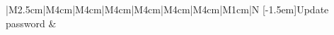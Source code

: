 \documentclass{article}
\begin{document}
\begin{table}[H]
\begin{tabular}{|M{2.5cm}|M{4cm}|M{4cm}|M{4cm}|M{4cm}|M{4cm}|M{4cm}|M{1cm}|N}
%
\hline%
[-1.5em]{\centering Update password
} &


\end{tabular}
\end{table}
\end{document}
